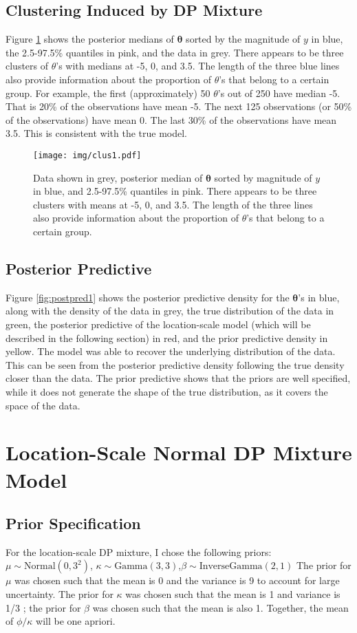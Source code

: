 \documentclass{article}
\def\beginmyfig{\begin{figure}[h]\center}
\def\endmyfig{\end{figure}}
\newcommand{\m}[1]{\mathbf{\bm{#1}}} %
\begin{document}
\subsection{Clustering Induced by DP Mixture}
Figure \ref{fig:clus1} shows the posterior medians of $\m\theta$ sorted by the
magnitude of $y$ in blue, the 2.5-97.5\% quantiles in pink, and the data in
grey.  There appears to be three clusters of $\theta$'s with medians at -5, 0,
and 3.5. The length of the three blue lines also provide information about the
proportion of $\theta$'s that belong to a certain group. For example, the first
(approximately) 50 $\theta$'s out of 250 have median -5. That is 20\% of the
observations have mean -5. The next 125 observations (or 50\% of the
observations) have mean 0. The last 30\% of the observations have mean 3.5.
This is consistent with the true model.  \\
\beginmyfig
  \texttt{[image: img/clus1.pdf]}
  \caption{Data shown in grey, posterior median of $\m\theta$ sorted
  by magnitude of $y$ in blue, and 2.5-97.5\% quantiles in pink.
  There appears to be three clusters with means at -5, 0, and 3.5.
  The length of the three lines also provide information about 
  the proportion of $\theta$'s that belong to a certain group.}
  \label{fig:clus1}
\endmyfig


\subsection{Posterior Predictive}
Figure \ref{fig:postpred1} shows the posterior predictive density for the
$\m\theta$'s in blue, along with the density of the data in grey, the true
distribution of the data in green, the posterior predictive of the
location-scale model (which will be described in the following section) in red,
and the prior predictive density in yellow.  The model was able to recover the
underlying distribution of the data. This can be seen from the posterior
predictive density following the true density closer than the data. The prior
predictive shows that the priors are well specified, while it does not generate
the shape of the true distribution, as it covers the space of the data.

\section{Location-Scale Normal DP Mixture Model}
\subsection{Prior Specification}
For the location-scale DP mixture, I chose the following priors:
$\mu\sim\text{Normal}(0,3^2) $, $\kappa\sim\text{Gamma}(3,3)$,$\beta\sim\text{InverseGamma}(2,1)$
The prior for $\mu$ was chosen such that the mean is 0 and the variance is 9 to account for 
large uncertainty. The prior for $\kappa$ was chosen such that the mean is 1 and variance is 1/3
; the prior for $\beta$ was chosen such that the mean is also 1. Together, the mean of $\phi/\kappa$
will be one apriori.
\end{document}

